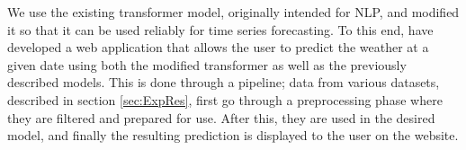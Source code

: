 We use the existing transformer model, originally intended for NLP, and modified it so that it can be used reliably for time series forecasting.
To this end, have developed a web application that allows the user to predict the weather at a given date using both the modified transformer as well as the previously described models.
This is done through a pipeline; data from various datasets, described in section \ref{sec:ExpRes}, first go through a preprocessing phase where they are filtered and prepared for use.
After this, they are used in the desired model, and finally the resulting prediction is displayed to the user on the website.  